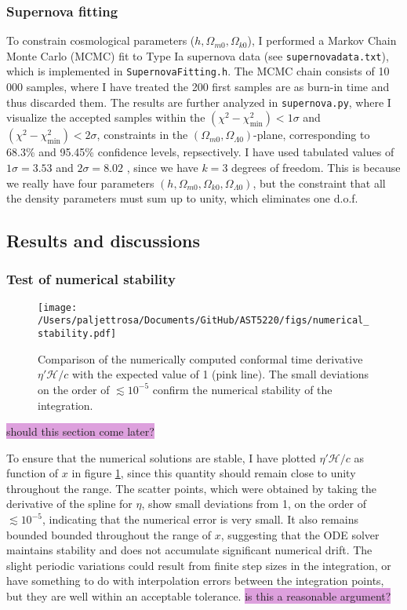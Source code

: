 \documentclass{aa}
\begin{document}
\subsubsection{Supernova fitting}
To constrain cosmological parameters ($h, \Omega_{m0}, \Omega_{k0}$), I performed a Markov Chain Monte Carlo (MCMC) fit to Type Ia supernova data (see \verb|supernovadata.txt|), which is implemented in \verb|SupernovaFitting.h|. The MCMC chain consists of 10$\,$000 samples, where I have treated the 200 first samples are as burn-in time and thus discarded them. The results are further analyzed in \verb|supernova.py|, where I visualize the accepted samples within the $(\chi^2-\chi^2_\text{min})<1\sigma$ and $(\chi^2-\chi^2_\text{min})<2\sigma$, constraints in the $(\Omega_{m0},\Omega_{\Lambda0})$-plane, corresponding to 68.3\% and 95.45\% confidence levels, repsectively. I have used tabulated values of $1\sigma=3.53$ and $2\sigma=8.02$ \citep[see][]{Chi2}, since we have $k=3$ degrees of freedom. This is because we really have four parameters $(h, \Omega_{m0}, \Omega_{k0}, \Omega_{\Lambda0})$, but the constraint that all the density parameters must sum up to unity, which eliminates one d.o.f. 


\subsection{Results and discussions}\label{subsec: I results}
\subsubsection{Test of numerical stability}
\begin{figure}
    \centering
    \texttt{[image: /Users/paljettrosa/Documents/GitHub/AST5220/figs/numerical\_stability.pdf]}
    \caption{Comparison of the numerically computed conformal time derivative  $\eta'\mathcal{H}/c$ with the expected value of 1 (pink line). The small deviations on the order of $\lesssim 10^{-5}$ confirm the numerical stability of the integration.}\label{fig:numerical stability}
\end{figure}

\colorbox{Plum}{should this section come later?}

To ensure that the numerical solutions are stable, I have plotted $\eta'\mathcal{H}/c$ as function of $x$ in figure \ref{fig:numerical stability}, since this quantity should remain close to unity throughout the range. The scatter points, which were obtained by taking the derivative of the spline for $\eta$, show small deviations from 1, on the order of $\lesssim 10^{-5}$, indicating that the numerical error is very small. It also remains bounded bounded throughout the range of $x$, suggesting that the ODE solver maintains stability and does not accumulate significant numerical drift. The slight periodic variations could result from finite step sizes in the integration, or have something to do with interpolation errors between the integration points, but they are well within an acceptable tolerance. \colorbox{Plum}{is this a reasonable argument?}
\end{document}
